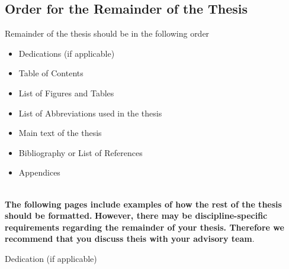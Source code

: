 \clearpage
\begin{instructional}
\section*{Order for the Remainder of the Thesis}
\noindent
    Remainder of the thesis should be in the following order

    \begin{itemize}
        \item Dedications (if applicable)
        \item Table of Contents
        \item List of Figures and Tables
        \item List of Abbreviations used in the thesis
        \item Main text of the thesis
        \item Bibliography or List of References
        \item Appendices

    \end{itemize}


\noindent
\\{\textbf{The following pages include examples of how the rest of the thesis should be formatted. }
\newline
\textbf{However, there may be discipline-specific requirements regarding the remainder of your thesis. Therefore we recommend that you discuss theis with your advisory team}.}
\end{instructional}
\clearpage


	\rmfamily
	\normalfont
    
    	\begin{vplace}[1]
		\begin{center}
        Dedication (if applicable)
		\end{center}
	\end{vplace}


\clearpage
\pagestyle{headings}


\tableofcontents
	\clearpage
\listoffigures
	\clearpage
\listoftables
\newpage

